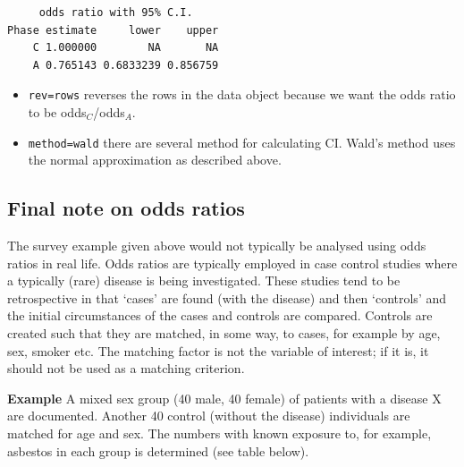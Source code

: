 \documentclass[
  oneside]{krantz}
\begin{document}
\begin{verbatim}
     odds ratio with 95% C.I.
Phase estimate     lower    upper
    C 1.000000        NA       NA
    A 0.765143 0.6833239 0.856759
\end{verbatim}

\begin{itemize}
\item
  \texttt{rev=\textquotesingle{}rows\textquotesingle{}} reverses the rows in the data object because we want the odds ratio to be odds\(_C\)/odds\(_A\).
\item
  \texttt{method=\textquotesingle{}wald\textquotesingle{}} there are several method for calculating CI. Wald's method uses the normal approximation as described above.
\end{itemize}

\hypertarget{final-note-on-odds-ratios}{%
\subsection{Final note on odds ratios}\label{final-note-on-odds-ratios}}

The survey example given above would not typically be analysed using odds ratios in real life. Odds ratios are typically employed in case control studies where a typically (rare) disease is being investigated. These studies tend to be retrospective in that `cases' are found (with the disease) and then `controls' and the initial circumstances of the cases and controls are compared\citep{Lewallen&Courtright1998}. Controls are created such that they are matched, in some way, to cases, for example by age, sex, smoker etc. The matching factor is not the variable of interest; if it is, it should not be used as a matching criterion.

\textbf{Example} A mixed sex group (40 male, 40 female) of patients with a disease X are documented. Another 40 control (without the disease) individuals are matched for age and sex. The numbers with known exposure to, for example, asbestos in each group is determined (see table below).
\end{document}
